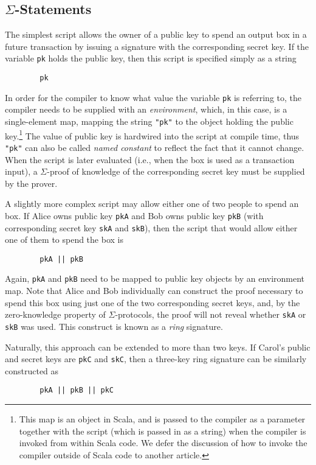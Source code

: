 \documentclass[11pt]{article}
\begin{document}
\subsection{$\Sigma$-Statements}
\label{sec:sigma-statements}

The simplest script allows the owner of a public key to spend an output box in a future transaction by issuing a signature with the corresponding secret key. If the variable \texttt{pk} holds the public key, then this script is specified simply as a string
\begin{verbatim}
        pk
\end{verbatim}

In order for the compiler to know what value the variable \texttt{pk} is referring to, the compiler needs to be supplied with an \emph{environment}, which, in this case, is a single-element map, mapping the string \texttt{"pk"} to the object holding the public key.\footnote{This map is an object in Scala, and is passed to the compiler as a parameter together with the script (which is passed in as a string) when the compiler is invoked from within Scala code. We defer the discussion of how to invoke the compiler outside of Scala code to another article.}
The value of public key is hardwired into the script at compile time, thus
\texttt{"pk"} can also be called \emph{named constant} to reflect the fact
that it cannot change. When the script is later evaluated (i.e., when the box
is used as a transaction input), a $\Sigma$-proof of knowledge of the
corresponding secret key must be supplied by the prover.

A slightly more complex script may allow either one of two people to spend an box. If Alice owns public key \texttt{pkA}  and Bob owns public key \texttt{pkB} (with corresponding secret key \texttt{skA} and \texttt{skB}), then the script that would allow either one of them to spend the box is
\begin{verbatim}
        pkA || pkB
\end{verbatim}
Again, \texttt{pkA} and \texttt{pkB} need to be mapped to public key objects by an environment map.
Note that Alice and Bob individually can construct the proof necessary to spend this box using just one of the two corresponding secret keys, and, by the zero-knowledge property of $\Sigma$-protocols, the proof will not reveal whether \texttt{skA} or \texttt{skB} was used. This construct is known as a \emph{ring} signature.

Naturally, this approach can be extended to more than two keys. If Carol's public and secret keys are \texttt{pkC} and \texttt{skC}, then a three-key ring signature can be similarly constructed as
\begin{verbatim}
        pkA || pkB || pkC
\end{verbatim}
\end{document}
